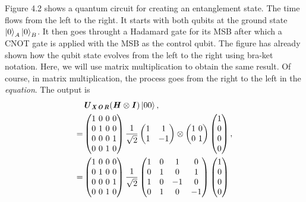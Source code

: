 \documentclass{article}
\newcommand{\bfit}[1]{\textbf{\textit{#1}}}
\begin{document}
Figure 4.2 shows a quantum circuit for creating an entanglement state. The time flows
from  the left to the right. It starts with both qubits at the ground state $\ket{0}_A \ket{0}_B$.
It then goes throught a Hadamard gate for its MSB after which a CNOT gate is applied
with the MSB as the control qubit. The figure has already shown how the
qubit state evolves from the left to the right using bra-ket notation. Here, we will use
matrix multiplication to obtain the same result. Of course, in matrix multiplication,
the process goes from the right to the left in the \textit{equation}. The output is
\begin{align} \label{eq 4.56}
    \begin{split}
        &\bfit{U}_{\bfit{X\! O\! R}}(\bfit{H}\otimes\bfit{I})\ket{00},\\
        =&\begin{pmatrix}
            1\ 0\ 0\ 0\\ 0\ 1\ 0\ 0\\ 0\ 0\ 0\ 1\\0\ 0\ 1\ 0
        \end{pmatrix}\frac{1}{\sqrt{2}}
        \begin{pmatrix}
            1& 1\\ 1& -1
        \end{pmatrix}\otimes
        \begin{pmatrix}
            1\ 0\\ 0\ 1
        \end{pmatrix}
        \begin{pmatrix}
            1\\0\\0\\0
        \end{pmatrix},\\
        =&\begin{pmatrix}
            1\ 0\ 0\ 0\\ 0\ 1\ 0\ 0\\ 0\ 0\ 0\ 1\\0\ 0\ 1\ 0
        \end{pmatrix}\frac{1}{\sqrt{2}}
        \begin{pmatrix}
            1& 0& 1& 0\\0& 1& 0& 1\\1& 0& -1& 0\\0& 1& 0& -1
        \end{pmatrix}
        \begin{pmatrix}
            1\\0\\0\\0

\end{pmatrix}
\end{split}
\end{align}
\end{document}
